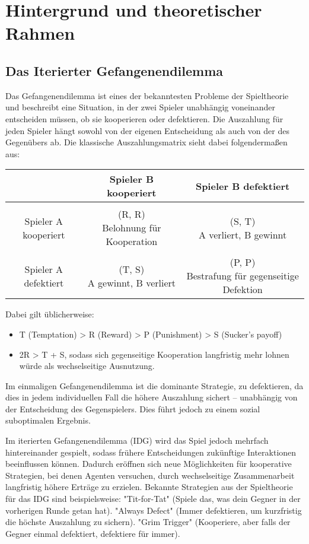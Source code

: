 \chapter{Hintergrund und theoretischer Rahmen}
\section{Das Iterierter Gefangenendilemma}
Das Gefangenendilemma ist eines der bekanntesten Probleme der Spieltheorie und 
beschreibt eine Situation, in der zwei Spieler unabhängig voneinander entscheiden 
müssen, ob sie kooperieren oder defektieren. Die Auszahlung für jeden Spieler hängt 
sowohl von der eigenen Entscheidung als auch von der des Gegenübers ab. 
Die klassische Auszahlungsmatrix sieht dabei folgendermaßen aus: \newline \newline 
\begin{tabular}{c|c|c}
        & Spieler B kooperiert & Spieler B defektiert\\
    \hline \\
    Spieler A kooperiert &  \makecell{(R, R) \\ Belohnung für Kooperation} & \makecell{(S, T) \\ A verliert, B gewinnt} \\
    \hline \\
    Spieler A defektiert &  \makecell{(T, S) \\ A gewinnt, B verliert} & \makecell{(P, P) \\ Bestrafung für gegenseitige Defektion} \\
\end{tabular}
Dabei gilt üblicherweise:
\begin{itemize}
    \item T (Temptation) > R (Reward) > P (Punishment) > S (Sucker's payoff)
    \item 2R > T + S, sodass sich gegenseitige Kooperation langfristig mehr lohnen würde als wechselseitige Ausnutzung.
\end{itemize}
Im einmaligen Gefangenendilemma ist die dominante Strategie, zu defektieren, da 
dies in jedem individuellen Fall die höhere Auszahlung sichert – unabhängig von der 
Entscheidung des Gegenspielers. Dies führt jedoch zu einem sozial suboptimalen 
Ergebnis.

Im iterierten Gefangenendilemma (IDG) wird das Spiel jedoch mehrfach hintereinander 
gespielt, sodass frühere Entscheidungen zukünftige Interaktionen beeinflussen können. 
Dadurch eröffnen sich neue Möglichkeiten für kooperative Strategien, bei denen 
Agenten versuchen, durch wechselseitige Zusammenarbeit langfristig höhere Erträge 
zu erzielen. Bekannte Strategien aus der Spieltheorie für das IDG sind beispielsweise:
"Tit-for-Tat" (Spiele das, was dein Gegner in der vorherigen Runde getan hat).
"Always Defect" (Immer defektieren, um kurzfristig die höchste Auszahlung zu sichern).
"Grim Trigger" (Kooperiere, aber falls der Gegner einmal defektiert, defektiere für immer).


